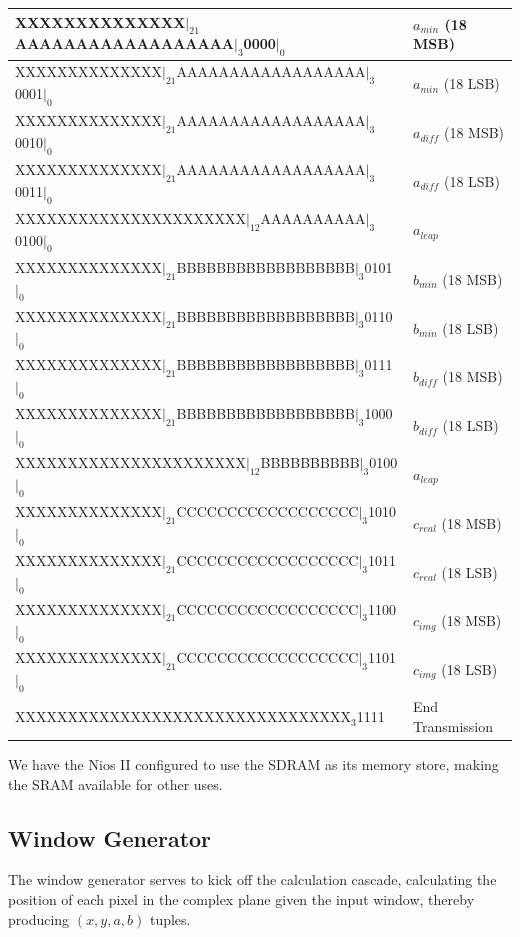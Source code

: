 \documentclass{article}
\begin{document}
\begin{tabular}{| l | l | }\\ \hline
XXXXXXXXXXXXXX$|_{21}$AAAAAAAAAAAAAAAAAA$|_3$0000$|_0$ & $a_{min}$ (18 MSB)\\ \hline
XXXXXXXXXXXXXX$|_{21}$AAAAAAAAAAAAAAAAAA$|_3$0001$|_0$ & $a_{min}$ (18 LSB)\\\hline
XXXXXXXXXXXXXX$|_{21}$AAAAAAAAAAAAAAAAAA$|_3$0010$|_0$ & $a_{diff}$ (18 MSB)\\\hline
XXXXXXXXXXXXXX$|_{21}$AAAAAAAAAAAAAAAAAA$|_3$0011$|_0$ & $a_{diff}$ (18 LSB)\\\hline
XXXXXXXXXXXXXXXXXXXXXX$|_{12}$AAAAAAAAAA$|_3$0100$|_0$ & $a_{leap}$ \\\hline
XXXXXXXXXXXXXX$|_{21}$BBBBBBBBBBBBBBBBBB$|_3$0101$|_0$ & $b_{min}$ (18 MSB)\\\hline
XXXXXXXXXXXXXX$|_{21}$BBBBBBBBBBBBBBBBBB$|_3$0110$|_0$ & $b_{min}$ (18 LSB)\\\hline
XXXXXXXXXXXXXX$|_{21}$BBBBBBBBBBBBBBBBBB$|_3$0111$|_0$ & $b_{diff}$ (18 MSB)\\\hline
XXXXXXXXXXXXXX$|_{21}$BBBBBBBBBBBBBBBBBB$|_3$1000$|_0$ & $b_{diff}$ (18 LSB)\\\hline
XXXXXXXXXXXXXXXXXXXXXX$|_{12}$BBBBBBBBBB$|_3$0100$|_0$ & $a_{leap}$ \\\hline
XXXXXXXXXXXXXX$|_{21}$CCCCCCCCCCCCCCCCCC$|_3$1010$|_0$ & $c_{real}$ (18 MSB)\\\hline
XXXXXXXXXXXXXX$|_{21}$CCCCCCCCCCCCCCCCCC$|_3$1011$|_0$ & $c_{real}$ (18 LSB)\\\hline
XXXXXXXXXXXXXX$|_{21}$CCCCCCCCCCCCCCCCCC$|_3$1100$|_0$ & $c_{img}$ (18 MSB)\\\hline
XXXXXXXXXXXXXX$|_{21}$CCCCCCCCCCCCCCCCCC$|_3$1101$|_0$ & $c_{img}$ (18 LSB)\\\hline
XXXXXXXXXXXXXXXXXXXXXXXXXXXXXXXX$_3$1111 & End Transmission\\\hline
\end{tabular}

We have the Nios II configured to use the SDRAM as its memory store,
making the SRAM available for other uses.

\subsection{Window Generator}

The window generator serves to kick off the calculation cascade,
calculating the position of each pixel in the complex plane given the
input window, thereby producing $(x, y, a, b)$ tuples.
\end{document}

